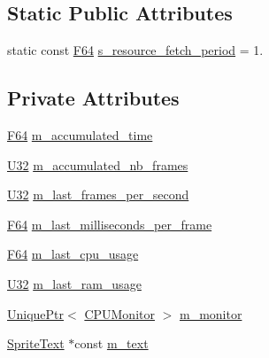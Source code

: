 \subsection*{Static Public Attributes}
\begin{DoxyCompactItemize}
\item 
static const \hyperlink{namespacemage_ad26233bbec640deda836e572c1a23708}{F64} \hyperlink{classmage_1_1script_1_1_stats_script_a856afce23ac27a1c44832f55be3b4be7}{s\+\_\+resource\+\_\+fetch\+\_\+period} = 1.
\end{DoxyCompactItemize}
\subsection*{Private Attributes}
\begin{DoxyCompactItemize}
\item 
\hyperlink{namespacemage_ad26233bbec640deda836e572c1a23708}{F64} \hyperlink{classmage_1_1script_1_1_stats_script_a41c1a4a0c73a6d5778b8ac7cd9d41bbc}{m\+\_\+accumulated\+\_\+time}
\item 
\hyperlink{namespacemage_a41c104c036fba3756a74e19f793eeaa1}{U32} \hyperlink{classmage_1_1script_1_1_stats_script_a7ef910aceb585af53110697ea5b3f810}{m\+\_\+accumulated\+\_\+nb\+\_\+frames}
\item 
\hyperlink{namespacemage_a41c104c036fba3756a74e19f793eeaa1}{U32} \hyperlink{classmage_1_1script_1_1_stats_script_a1ce1ed31e122346361d01cefb012e443}{m\+\_\+last\+\_\+frames\+\_\+per\+\_\+second}
\item 
\hyperlink{namespacemage_ad26233bbec640deda836e572c1a23708}{F64} \hyperlink{classmage_1_1script_1_1_stats_script_a6c531ad04b2fa2ce530af06914d362b9}{m\+\_\+last\+\_\+milliseconds\+\_\+per\+\_\+frame}
\item 
\hyperlink{namespacemage_ad26233bbec640deda836e572c1a23708}{F64} \hyperlink{classmage_1_1script_1_1_stats_script_aa139c88470e13a6af4c5d715107c32e6}{m\+\_\+last\+\_\+cpu\+\_\+usage}
\item 
\hyperlink{namespacemage_a41c104c036fba3756a74e19f793eeaa1}{U32} \hyperlink{classmage_1_1script_1_1_stats_script_a0ea0dcf90e4364af1f64d67024314a94}{m\+\_\+last\+\_\+ram\+\_\+usage}
\item 
\hyperlink{namespacemage_a3316d7143a973e37adf1110f2e80ca31}{Unique\+Ptr}$<$ \hyperlink{classmage_1_1_c_p_u_monitor}{C\+P\+U\+Monitor} $>$ \hyperlink{classmage_1_1script_1_1_stats_script_a400a588c3e8c65344af131324f7d3f54}{m\+\_\+monitor}
\item 
\hyperlink{classmage_1_1_sprite_text}{Sprite\+Text} $\ast$const \hyperlink{classmage_1_1script_1_1_stats_script_a684581902f697b5503b8a86344062600}{m\+\_\+text}
\end{DoxyCompactItemize}
